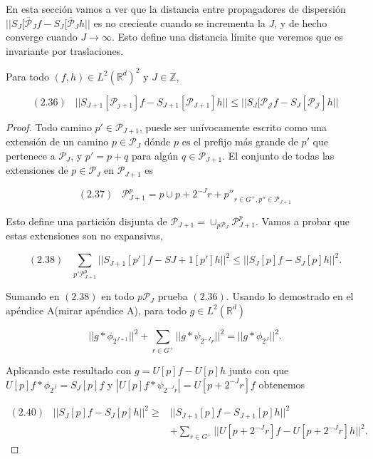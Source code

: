 \noindent En esta sección vamos a ver que la distancia entre propagadores de dispersión $||S_J[\overline{\mathcal{P}}_J f- S_J[\overline{\mathcal{P}}_J h ||$ es no creciente cuando se incrementa la $J$, y de hecho converge cuando $J \rightarrow \infty$. Esto define una distancia límite que veremos que es invariante por traslaciones.

\medskip

\begin{proposicion}
\noindent Para todo $(f,h) \in L^2(\mathbb{R}^d)^2$ y $J\in \mathbb{Z}$, 

$$(2.36) \;\;\; || S_{J+1} [\mathcal{P}_{j+1}]f- S_{J+1}[\mathcal{P}_{J+1}]h || \leq ||S_J[\mathcal{P_J}f - S_J[\mathcal{P_J}]h ||$$
\end{proposicion}

\begin{proof}
\noindent Todo camino $p' \in \mathcal{P}_{J+1}$, puede ser unívocamente escrito como una extensión de un camino $p\in \mathcal{P}_J$ dónde $p$ es el prefijo más grande de $p'$ que pertenece a $\mathcal{P}_J$, y $p'=p+q$ para algún $q\in \mathcal{P}_{J+1}$. El conjunto de todas las extensiones de $p\in \mathcal{P}_J$ en $\mathcal{P}_{J+1}$ es 

$$(2.37) \;\;\; \mathcal{P}_{J+1}^{p}={p} \cup {p+2^{-J}r+p''}_{r\in G^{+},p''\in \mathcal{P}_{J+1}}$$

Esto define una partición disjunta de $\mathcal{P}_{J+1}=\cup_{p\mathcal{P}_J} \mathcal{P}_{J+1}^{p}$. Vamos a probar que estas extensiones son no expansivas, 

$$(2.38) \;\;\; \sum_{p'\mathcal{P}_{J+1}^p} || S_{J+1}[p']f-S{J+1}[p']h||^2 \leq ||S_{J}[p]f-S_J [p]h||^2.$$

\noindent Sumando en $(2.38)$ en todo $p\mathcal{P}_J$ prueba $(2.36)$. Usando lo demostrado en el apéndice A(mirar apéndice A), para todo $g\in L^2(\mathbb{R}^d)$

$$||g \ast \phi_{2^{J+1}} ||^2 + \sum_{r\in G^+} || g\ast \psi_{2^{-J}r} ||^2=||g \ast \phi_{2^J}||^2.$$

\noindent Aplicando este resultado con $g=U[p]f-U[p]h$ junto con que $U[p]f\ast \phi_{2^J}=S_J[p]f$ y $|U[p]f\ast\psi_{2^{-J}r}|=U[p+2^{-J}r]f$ obtenemos

\begin{align*}
    (2.40) \;\;\; ||S_{J}[p]f-S_J[p]h||^2 \geq & || S_{J+1}[p]f-S_{J+1}[p]h||^2 \\
    & + \sum_{r\in G^+} ||U[p+2^{-J}r]f-U[p+2^{-J}r]h||^2.
\end{align*}


\end{proof}
